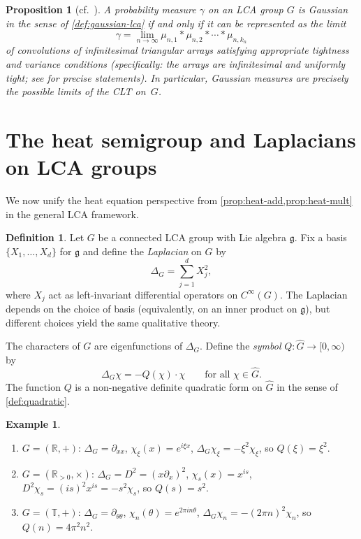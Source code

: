 \documentclass[12pt]{amsart}
\newtheorem{proposition}[theorem]{Proposition}
\theoremstyle{definition}
\newtheorem{definition}[theorem]{Definition}
\newtheorem{example}[theorem]{Example}
\theoremstyle{remark}
\newcommand{\R}{\mathbb{R}}
\newcommand{\Rpos}{\mathbb{R}_{>0}}
\newcommand{\bT}{\mathbb{T}}
\begin{document}
\begin{proposition}[{cf.\ \cite[Theorem~VI.5.11]{Parthasarathy}}]\label{prop:gaussian-characterization}
A probability measure $\gamma$ on an LCA group $G$ is Gaussian in the sense of \cref{def:gaussian-lca} if and only if it can be represented as the limit
\[
\gamma = \lim_{n \to \infty} \mu_{n,1} * \mu_{n,2} * \cdots * \mu_{n,k_n}
\]
of convolutions of infinitesimal triangular arrays satisfying appropriate tightness and variance conditions (specifically: the arrays are infinitesimal and uniformly tight; see \cite[Definition~VI.5.1]{Parthasarathy} for precise statements). In particular, Gaussian measures are precisely the possible limits of the CLT on~$G$.
\end{proposition}

\section{The heat semigroup and Laplacians on LCA groups}

We now unify the heat equation perspective from \cref{prop:heat-add,prop:heat-mult} in the general LCA framework.

\begin{definition}\label{def:laplacian}
Let $G$ be a connected LCA group with Lie algebra $\mathfrak{g}$. Fix a basis $\{X_1, \ldots, X_d\}$ for $\mathfrak{g}$ and define the \emph{Laplacian} on $G$ by
\[
\Delta_G = \sum_{j=1}^d X_j^2,
\]
where $X_j$ act as left-invariant differential operators on $C^\infty(G)$. The Laplacian depends on the choice of basis (equivalently, on an inner product on $\mathfrak{g}$), but different choices yield the same qualitative theory.
\end{definition}

The characters of $G$ are eigenfunctions of $\Delta_G$. Define the \emph{symbol} $Q : \widehat{G} \to [0, \infty)$ by
\begin{equation}\label{eq:symbol}
\Delta_G \chi = -Q(\chi) \cdot \chi \qquad \text{for all } \chi \in \widehat{G}.
\end{equation}
The function $Q$ is a non-negative definite quadratic form on $\widehat{G}$ in the sense of \cref{def:quadratic}.

\begin{example}\label{ex:laplacian-symbol}
\begin{enumerate}[label=(\alph*)]
\item $G = (\R, +)$: $\Delta_G = \partial_{xx}$, $\chi_\xi(x) = e^{i\xi x}$, $\Delta_G \chi_\xi = -\xi^2 \chi_\xi$, so $Q(\xi) = \xi^2$.
\item $G = (\Rpos, \times)$: $\Delta_G = D^2 = (x\partial_x)^2$, $\chi_s(x) = x^{is}$, $D^2 \chi_s = (is)^2 x^{is} = -s^2 \chi_s$, so $Q(s) = s^2$.
\item $G = (\bT, +)$: $\Delta_G = \partial_{\theta\theta}$, $\chi_n(\theta) = e^{2\pi i n\theta}$, $\Delta_G \chi_n = -(2\pi n)^2 \chi_n$, so $Q(n) = 4\pi^2 n^2$.
\end{enumerate}
\end{example}
\end{document}
